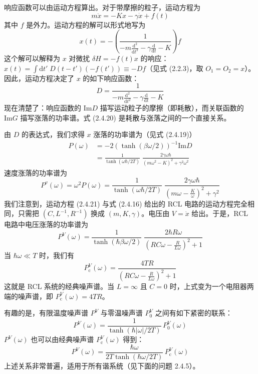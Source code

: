 响应函数可以由运动方程算出。对于带摩擦的粒子，运动方程为
\begin{equation*}
m\ddot{x} = -Kx - \gamma\dot{x} + f(t) \tag{2.4.21}
\end{equation*}
其中 $f$ 是外力。运动方程的解可以形式地写为
\begin{equation*}
x(t) = -\left(\frac{1}{-m\frac{\mathrm{d}^2}{\mathrm{d}t^2} - \gamma\frac{\mathrm{d}}{\mathrm{d}t} - K}\right)f
\end{equation*}
这个解可以解释为 $x$ 对微扰 $\delta H = -f(t)x$ 的响应：$x(t) = \int \mathrm{d}t'\;D(t - t')(-f(t')) \equiv -Df$（见式 (2.2.3)，取 $O_1 = O_2 = x$）。因此，运动方程决定了 $x$ 的如下响应函数：
\begin{equation*}
D = \frac{1}{-m\frac{\mathrm{d}^2}{\mathrm{d}t^2} - \gamma\frac{\mathrm{d}}{\mathrm{d}t} - K}
\end{equation*}
现在清楚了：响应函数的 $\mathrm{Im}D$ 描写运动粒子的摩擦（即耗散），而关联函数的 $\mathrm{Im}G$ 描写涨落的功率谱。式 (2.4.20) 是耗散与涨落之间的一个直接关系。

由 $D$ 的表达式，我们求得 $x$ 涨落的功率谱为（见式 (2.4.19)）
\begin{align*}
P(\omega) &= -2\left(\tanh(\beta\omega/2)\right)^{-1}\mathrm{Im}D\\
&= \frac{1}{\tanh(\omega\hbar/2T)}\;\frac{2\gamma\omega\hbar}{(m\omega^2 - K)^2 + \gamma^2\omega^2} \tag{2.4.22}
\end{align*}
速度涨落的功率谱为
\begin{equation*}
P^v(\omega) = \omega^2 P(\omega) = \frac{1}{\tanh(\omega\hbar/2T)}\;\frac{2\gamma\omega\hbar}{(m\omega - \frac{K}{\omega})^2 + \gamma^2}
\end{equation*}
我们注意到，运动方程 (2.4.21) 与式 (2.4.16) 给出的 RCL 电路的运动方程完全相同，只需把 $(C, L^{-1}, R^{-1})$ 换成 $(m, K, \gamma)$。电压由 $V = \dot{x}$ 给出。于是，RCL 电路中电压涨落的功率谱为
\begin{equation*}
P^V(\omega) = \frac{1}{\tanh(\hbar\beta\omega/2)}\;\frac{2\hbar R\omega}{(RC\omega - \frac{R}{L\omega})^2 + 1} \tag{2.4.23}
\end{equation*}
当 $\hbar\omega \ll T$ 时，我们有
\begin{equation*}
P_{\mathrm{c}}^V(\omega) = \frac{4TR}{(RC\omega - \frac{R}{L\omega})^2 + 1}
\end{equation*}
这就是 RCL 系统的经典噪声谱。当 $L = \infty$ 且 $C = 0$ 时，上式变为一个电阻器两端的噪声谱，即 $P_{\mathrm{c}}^V(\omega) = 4TR$。

有趣的是，有限温度噪声谱 $P^V$ 与零温噪声谱 $P_0^V$ 之间有如下紧密的联系：
\begin{equation*}
P^V(\omega) = \frac{1}{\tanh(\hbar|\omega|/2T)}\,P_0^V(\omega) \tag{2.4.24}
\end{equation*}
$P^V(\omega)$ 也可以由经典噪声谱 $P_{\mathrm{c}}^V(\omega)$ 得到：
\begin{equation*}
P^V(\omega) = \frac{\hbar\omega}{2T\tanh(\hbar\omega/2T)}\,P_{\mathrm{c}}^V(\omega)
\end{equation*}
上述关系非常普遍，适用于所有谐系统（见下面的问题 2.4.5）。

